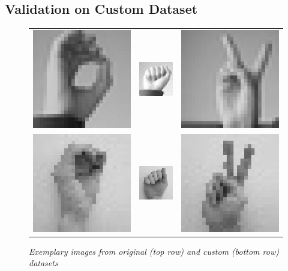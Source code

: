 \documentclass[a4paper]{article}
\begin{document}
\subsection{Validation on Custom Dataset}
\begin{figure}[t]
     \centering
     \begin{tabular}{ccc}
          \includegraphics[width=.25\linewidth]{graphics/custom_dataset/orig0}&\includegraphics[width=.25\linewidth]{graphics/custom_dataset/orig1}&\includegraphics[width=.25\linewidth]{graphics/custom_dataset/orig2} \\
          \includegraphics[width=.25\linewidth]{graphics/custom_dataset/custom0}&\includegraphics[width=.25\linewidth]{graphics/custom_dataset/custom1}&\includegraphics[width=.25\linewidth]{graphics/custom_dataset/custom2}
     \end{tabular}
     \caption{\textit{Exemplary images from original (top row) and custom (bottom row) datasets}}
     \label{fig:custom_dataset} 
\end{figure}
\end{document}
